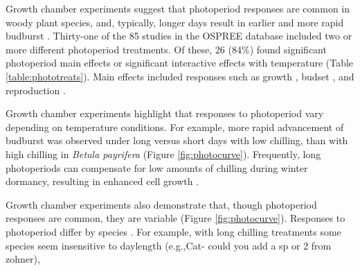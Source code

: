 \documentclass{article}
\begin{document}
\par Growth chamber experiments suggest that photoperiod responses are common in woody plant species, and, typically, longer days result in earlier and more rapid budburst \citep [e.g., ][]{Caffarra:2011a}. Thirty-one of the 85 studies in the OSPREE database included two or more different photoperiod treatments. Of these, 26 (84\%) found significant photoperiod main effects or significant interactive effects with temperature (Table \ref{table:phototreats}). Main effects included responses such as growth \citep[e.g., higher growth rates with longer days ][]{Ashby:1962aa}, budset \citep[e.g., more rapid induction of budset with shorter days][]{Howe:1995aa}, and reproduction \citep[e.g., increased flowering with longer days ][]{Heide:2012aa}. 
\par Growth chamber experiments highlight that responses to photoperiod vary depending on temperature conditions. For example, more rapid advancement of budburst was observed under long versus short days with low chilling, than with high chilling in \emph{Betula payrifera} \citep{Hawkins:2012} (Figure \ref{fig:photocurve}). Frequently, long photoperiods can compensate for low amounts of chilling during winter dormancy, resulting in enhanced cell growth \citep{Heide:1993,Myking:1995,Caffarra:2011b}.
\par Growth chamber experiments also demonstrate that, though photoperiod responses are common, they are variable (Figure \ref{fig:photocurve}). Responses to photoperiod differ by species \citep[e.g.,][]{Heide:1993a,Howe:1996,Basler:2012, Basler:2014aa,zohner2016,flynn2018}. For example, with long chilling treatments some species seem insensitive to daylength (e.g.,Cat- could you add a sp or 2 from zohner), %
\end{document}
